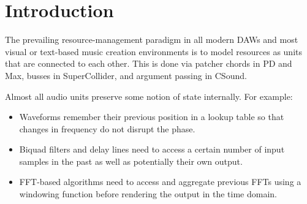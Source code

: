 \documentclass{article}
\title{\papertitle}
\begin{document}
%
\capstartfalse
\maketitle
\capstarttrue
%
\begin{abstract}
Audio programming languages fall into two broad categories: imperative (CSound, sclang) and functional (Faust, tidal). For the latter, the declarative and immutable nature of data and control structures are often at odds with the mutable and referentially opaque nature of audio units like oscillators and filters. Recently, languages such as Rust have bridged this chasm through zero-cost abstractions that manage resource allocation in otherwise functional settings. In the same spirit, this paper presents a zero-cost abstraction for the management of audio units when working with pure audio rendering functions. The result is automatic audio memory management that incurs a minimal runtime penalty while retaining an expressive functional syntax.
\end{abstract}
%

\section{Introduction}\label{sec:introduction}
The prevailing resource-management paradigm in all modern DAWs and most visual or text-based music creation environments is to model resources as units that are connected to each other. This is done via patcher chords in PD and Max, busses in SuperCollider, and argument passing in CSound.



Almost all audio units preserve some notion of state internally. For example:

\begin{itemize}
\item Waveforms remember their previous position in a lookup table so that changes in frequency do not disrupt the phase.
\item Biquad filters and delay lines need to access a certain number of input samples in the past as well as potentially their own output.
\item FFT-based algorithms need to access and aggregate previous FFTs using a windowing function before rendering the output in the time domain.
\end{itemize}
\end{document}
